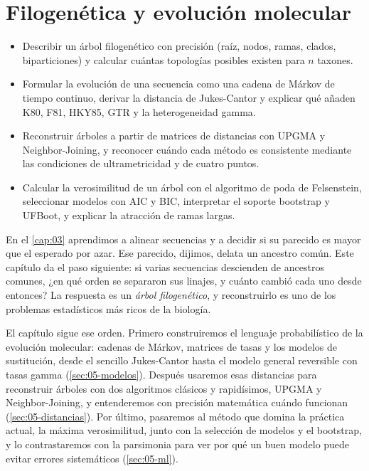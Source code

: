 \chapter{Filogenética y evolución molecular}\label{cap:05}


\begin{objetivos}
\begin{itemize}
  \item Describir un árbol filogenético con precisión (raíz, nodos, ramas, clados, biparticiones) y calcular cuántas topologías posibles existen para $n$ taxones.
  \item Formular la evolución de una secuencia como una cadena de Márkov de tiempo continuo, derivar la distancia de Jukes-Cantor y explicar qué añaden K80, F81, HKY85, GTR y la heterogeneidad gamma.
  \item Reconstruir árboles a partir de matrices de distancias con UPGMA y Neighbor-Joining, y reconocer cuándo cada método es consistente mediante las condiciones de ultrametricidad y de cuatro puntos.
  \item Calcular la verosimilitud de un árbol con el algoritmo de poda de Felsenstein, seleccionar modelos con AIC y BIC, interpretar el soporte bootstrap y UFBoot, y explicar la atracción de ramas largas.
\end{itemize}
\end{objetivos}

En el \cref{cap:03} aprendimos a alinear secuencias y a decidir si su parecido es mayor que el esperado por azar. Ese parecido, dijimos, delata un ancestro común. Este capítulo da el paso siguiente: si varias secuencias descienden de ancestros comunes, ¿en qué orden se separaron sus linajes, y cuánto cambió cada uno desde entonces? La respuesta es un \emph{árbol filogenético}, y reconstruirlo es uno de los problemas estadísticos más ricos de la biología.

El capítulo sigue ese orden. Primero construiremos el lenguaje probabilístico de la evolución molecular: cadenas de Márkov, matrices de tasas y los modelos de sustitución, desde el sencillo Jukes-Cantor hasta el modelo general reversible con tasas gamma (\cref{sec:05-modelos}). Después usaremos esas distancias para reconstruir árboles con dos algoritmos clásicos y rapidísimos, UPGMA y Neighbor-Joining, y entenderemos con precisión matemática cuándo funcionan (\cref{sec:05-distancias}). Por último, pasaremos al método que domina la práctica actual, la máxima verosimilitud, junto con la selección de modelos y el bootstrap, y lo contrastaremos con la parsimonia para ver por qué un buen modelo puede evitar errores sistemáticos (\cref{sec:05-ml}).

